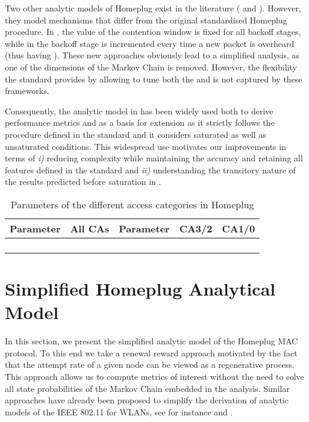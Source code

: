 \documentclass[preprint,12pt]{elsarticle}
\begin{document}
Two other analytic models of Homeplug exist in the literature (\cite{kriminger2011markov} and \cite{campista2005improving}). However, they model mechanisms that differ from the original standardised Homeplug procedure. In \cite{kriminger2011markov}, the value of the contention window is fixed for all backoff stages, while in \cite{campista2005improving} the backoff stage is incremented every time a new packet is overheard (thus having ). These new approaches obviously lead to a simplified analysis, as one of the dimensions of the Markov Chain is removed. However, the flexibility the standard provides by allowing to tune both the  and  is not captured by these frameworks.

Consequently, the analytic model in \cite{chung2006performance} has been widely used both to derive performance metrics and as a basis for extension \cite{yoon2008adaptive,koutny2011homeplug,pinero2011homeplug,koutny2013analysis,pinero2011realistic,yoon2013multichannel} as it strictly follows the procedure defined in the standard and it considers saturated as well as unsaturated conditions. This widespread use motivates our improvements in terms of \emph{i)} reducing complexity while maintaining the accuracy and retaining all features defined in the standard \cite{HomeplugStd} and \emph{ii)} understanding the transitory nature of the results predicted before saturation in \cite{chung2006performance}.

\begin{table}
\centering
\begin{tabular}{ccccc} 
Parameter & All CAs & Parameter & CA3/2 & CA1/0 \\ \hline
 &  &  &  &  \\ \hline
 &  &  &  &  \\ \hline
 &  &  &  &  \\ \hline
 &  &  &  &  \\  \hline
\end{tabular}
\caption{Parameters of the different access categories in Homeplug}\label{tbl:access_categories}
\end{table}

\section{Simplified Homeplug Analytical Model}\label{sec:model}

In this section, we present the simplified analytic model of the Homeplug MAC protocol. To this end we take a renewal reward approach \cite{kumar05,bianchi05} motivated by the fact that the attempt rate of a given node can be viewed as a regenerative process. This approach allows us to compute metrics of interest without the need to solve all state probabilities of the Markov Chain embedded in the analysis. Similar approaches have already been proposed to simplify the derivation of analytic models of the IEEE 802.11 for WLANs, see for instance \cite{medepalli2005system} and \cite{BBellalta-Eurocon2005}.  
\end{document}
